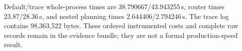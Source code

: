 Default/trace whole-process times are 38.790667/43.943255\,s, router times 23.87/28.36\,s, and nested planning times 2.644406/2.794246\,s. The trace log contains 98,363,522 bytes. These ordered instrumented costs and complete raw records remain in the evidence bundle; they are not a formal production-speed result.
